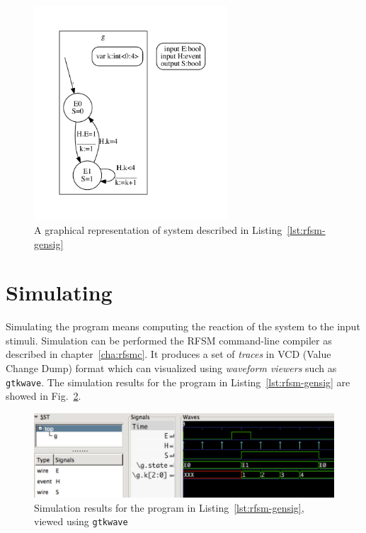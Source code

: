 \begin{figure}[!h]
   \includegraphics[height=8cm]{figs/gensig-top}
   \centering
  \caption{A graphical representation of system described in Listing~\ref{lst:rfsm-gensig}}
  \label{fig:rfsm-gensig-top}
\end{figure}

\section*{Simulating}
\label{sec:simulating-1}

Simulating the program means computing the reaction of the system to the input stimuli. Simulation
can be performed the RFSM command-line compiler as described in chapter~\ref{cha:rfsmc}.
It produces a set of
\emph{traces} in VCD (Value Change Dump) format which can visualized using \emph{waveform viewers}
such as \texttt{gtkwave}. The simulation results for the program in Listing~\ref{lst:rfsm-gensig}
are showed in Fig.~\ref{fig:rfsm-gensig-chrono}.

\begin{figure}[!h]
   \includegraphics[width=\textwidth]{figs/gensig-chrono}
   \centering
  \caption{Simulation results for the program in Listing~\ref{lst:rfsm-gensig}, viewed using
    \texttt{gtkwave}}
  \label{fig:rfsm-gensig-chrono}
\end{figure}

